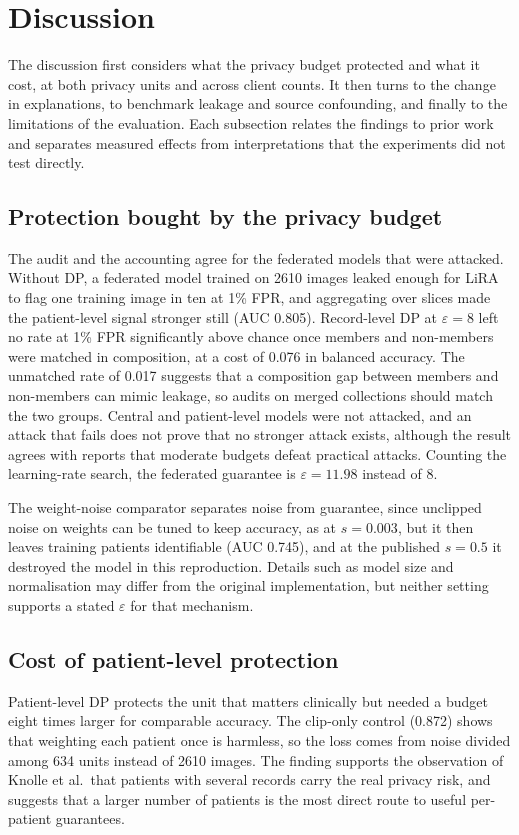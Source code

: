 \documentclass[preprint,12pt]{elsarticle}
\begin{document}
\section{Discussion}\label{sec:discussion}
The discussion first considers what the privacy budget protected and what it cost, at both privacy units and across
client counts. It then turns to the change in explanations, to benchmark leakage and source confounding, and finally to
the limitations of the evaluation. Each subsection relates the findings to prior work and separates measured effects
from interpretations that the experiments did not test directly.

\subsection{Protection bought by the privacy budget}
The audit and the accounting agree for the federated models that were attacked. Without DP, a federated model trained
on 2610 images leaked enough for LiRA to flag one training image in ten at 1\% FPR, and aggregating over slices made
the patient-level signal stronger still (AUC 0.805). Record-level DP at $\varepsilon=8$ left no rate at 1\% FPR
significantly above chance once members and non-members were matched in composition, at a cost of 0.076 in balanced
accuracy. The unmatched rate of 0.017 suggests that a composition gap between members and non-members can mimic leakage,
so audits on merged collections should match the two groups. Central and patient-level models were not attacked, and
an attack that fails does not prove that no stronger attack exists, although the result agrees with reports that
moderate budgets defeat practical attacks.\cite{ziller2024} Counting the learning-rate search, the federated
guarantee is $\varepsilon=11.98$ instead of 8.

The weight-noise comparator separates noise from guarantee, since unclipped noise on weights can be tuned to keep
accuracy, as at $s=0.003$, but it then leaves training patients identifiable (AUC 0.745), and at the published $s=0.5$ it
destroyed the model in this reproduction. Details such as model size and normalisation may differ from the original
implementation, but neither setting supports a stated $\varepsilon$ for that mechanism.\cite{gupta2026}

\subsection{Cost of patient-level protection}
Patient-level DP protects the unit that matters clinically but needed a budget eight times larger for comparable
accuracy. The clip-only control (0.872) shows that weighting each patient once is harmless, so the loss comes from
noise divided among 634 units instead of 2610 images. The finding supports the observation of Knolle et al.\ that
patients with several records carry the real privacy risk,\cite{knolle2026} and suggests that a larger number of
patients is the most direct route to useful per-patient guarantees.
\end{document}
